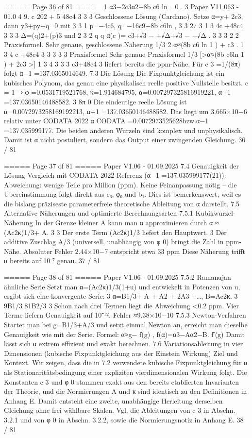 \begin{MyVerbatim}
{===== Page 36 of 81 =====
1
α3−2c3α2−8b c6 ln =0 .
3 Paper V11.063 - 01.0 4 9. c 202 + 5 48c4
3 3 3
Geschlossene Lösung (Cardano). Setze α=y+ 2c3, dann y3+py+q=0 mit
3 3
1
p=−4c6, q=−16c9−8b c6ln ,
3 3 27 3 1 3 4c +48c4
3 3 3
Δ=(q)2+(p)3
und
2 3
2 q q
α(c )= c3+√3 − +√Δ+√3 − −√Δ .
3 3 3 2 2
Praxisformel. Sehr genaue, geschlossene Näherung
1/3 2
α≈(8b c6 ln 1 ) + c3 .
1 3 4 c +48c4 3 3
3 3 3
Praxisformel
Sehr genaue Praxisformel
1/3
[>α≈(8b c6ln 1 ) + 2c3 >]
1 3 4 3 3
3
c3+48c4
3
liefert bereits die ppm-Nähe. Für c 3 =1/(8π) folgt α−1 =137.0365014649.
7.3 Die Lösung
Die Fixpunktgleichung ist ein kubisches Polynom, das genau eine physikalisch reelle positive Nullstelle besitzt.
c = 1 ⇒ φ =0.0531719521768, κ=1.914684795, α=0.007297325816919221, α−1 =137.03650146488582.
3 8π 0
Die eindeutige reelle Lösung ist
α=0.0072973258169192213, α−1 =137.03650146488582.
Das liegt um 3.665×10−6 relativ unter CODATA 2022 α CODATA =0.0072973525628bzw.α−1 =137.035999177.
Die beiden anderen Wurzeln sind komplex und unphysikalisch.
Damit ist α nicht postuliert, sondern das Output einer zwingenden Gleichung.
36 / 81

===== Page 37 of 81 =====
Paper V1.06 - 01.09.2025
7.4 Genauigkeit der Lösung
Vergleich mit CODATA 2022 Referenz (α−1 =137.035999177(21)):
Abweichung: wenige Teile pro Million (ppm).
Keine Feinanpassung nötig – die Übereinstimmung folgt direkt aus c₃, φ₀ und b₁.
Dies ist bemerkenswert, weil es die bislang präziseste parameterfreie theoretische Ableitung von α darstellt.
7.5 Alternative Näherungen und optimierte Berechnungsarten
7.5.1 Kubikwurzel-Näherung
In der Grenze kleiner A kann man α approximieren durch
α ≈ (Ac2κ)1/3+ A.
3 3
Der erste Term (Ac2κ)1/3 liefert den Hauptwert.
3
Der additive Zuschlag A/3 (universell, unabhängig von φ 0) bringt die Zahl in ppm-Nähe.
Absoluter Fehler
2.44×10−7
entspricht etwa 33 ppm
Diese Näherung trifft α bereits auf 10⁻⁷ genau.
37 / 81

===== Page 38 of 81 =====
Paper V1.06 - 01.09.2025
7.5.2 Ramanujan-ähnliche Serie
Setzt man α=(Ac2κ)1/3(1+u) und entwickelt in Potenzen von u, ergibt sich eine konvergente Serie:
3
α=B1/3+ A + A2 + 2A3 +…, B=Ac2κ.
3 9B1/3 81B2/3 3
Schon nach drei Termen liegt die Abweichung <0.2 ppm.
Vier Terme liefern Genauigkeit auf 10⁻¹².
Fehler ≈9.38×10−10
7.5.3 Newton-Verfahren
Startet man bei g=B1/3+A/3 und setzt einmal Newton an, erreicht man dieselbe Genauigkeit wie mit der Serie.
Formel:
α≈g− f(g) , f(α)=α3−Aα2−B.
f′(g)
Damit lässt sich α extrem effizient und exakt berechnen.
7.6 Variationsableitung in vier Dimensionen (kubische Fixpunktgleichung aus der
Einstein Wirkung)
Ziel und Kontext. Wir zeigen, dass die in 7.2 verwendete kubische Fixpunktgleichung für α als Stationaritätsbedingung
einer expliziten vierdimensionalen Wirkung folgt. Die Konstanten c 3 und φ 0 stammen exakt aus den bereits etablierten
Invarianten der Theorie, und die Normierungen A und κ sind identisch zu den Definitionen in Anhang E. Damit entsteht
eine zweite, unabhängige Herleitung derselben Gleichung ohne frei wählbare Skalen. Vgl. die Ableitungen von c 3 in
Abschn. 3.2.1 und von φ 0 in Abschn. 3.2.2, sowie die Normierungsnotiz in Anhang E.
38 / 81

}
\end{MyVerbatim}
